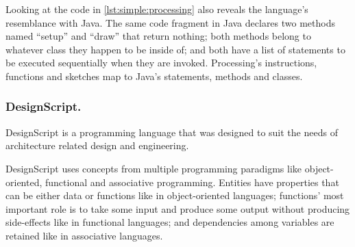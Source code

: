 \documentclass{./llncs2e/llncs}
\begin{document}
	Looking at the code in \ref{lst:simple:processing} also reveals the language's resemblance with Java. 
	The same code fragment in Java declares two methods named ``setup'' and ``draw'' that return nothing; both methods belong to whatever class they happen to be inside of; and both have a list of statements to be executed sequentially when they are invoked. 
	Processing's instructions, functions and sketches map to Java's statements, methods and classes.
	

\subsubsection{DesignScript.}
	DesignScript\cite{aish2012designscript} is a programming language that was designed to suit the needs of architecture related design and engineering.
	
	DesignScript uses concepts from multiple programming paradigms like object-oriented, functional and associative programming. 
	Entities have properties that can be either data or functions like in object-oriented languages; functions' most important role is to take some input and produce some output without producing side-effects like in functional languages; and dependencies among variables are retained like in associative languages.
	
\end{document}
